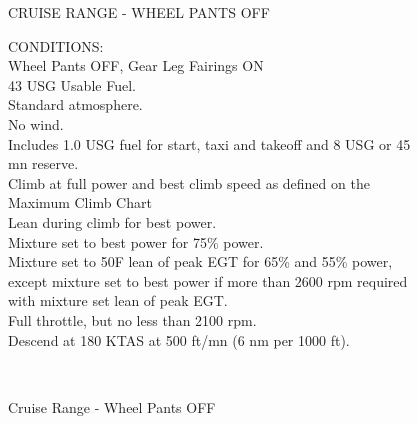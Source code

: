 \begin{figure}[t]
\begin{center}
\begin{perfhdr}CRUISE RANGE - WHEEL PANTS OFF\\
\end{perfhdr}

\begin{minipage}{5in}
  \begin{flushleft}
    CONDITIONS:\\
    Wheel Pants OFF, Gear Leg Fairings ON\\
    43 USG Usable Fuel.\\
    Standard atmosphere.\\
    No wind.\\
    Includes 1.0 USG fuel for start, taxi and takeoff and 8 USG or 45 mn reserve.\\
    Climb at full power and best climb speed as defined on the Maximum Climb Chart\\
    Lean during climb for best power.\\
    Mixture set to best power for 75\% power.\\
    Mixture set to 50\textdegree F lean of peak EGT for 65\% and 55\% power, except mixture set to best power if more than 2600 rpm required with mixture set lean of peak EGT.\\
    Full throttle, but no less than 2100 rpm.\\
    Descend at 180 KTAS at 500 ft/mn (6 nm per 1000 ft).\\
    \end{flushleft}
\end{minipage}\\
\vspace{5ex}
\end{center}  %
\caption{Cruise Range - Wheel Pants OFF}
\label{Cruise-range-WP-OFF}
\end{figure}
\clearpage


